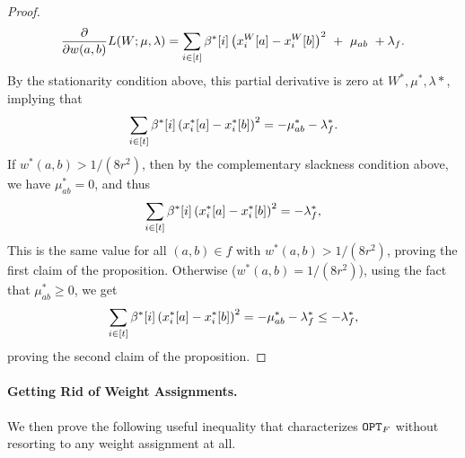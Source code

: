 \documentclass{article}
\begin{document}
\begin{proof}
\begin{align*}
        \frac{\partial}{\partial w(a,b)} L(W;\mu,\lambda) =
        \sum_{i\in [t]} \beta^*[i] \kh{x_i^{W}[a] - x_i^W[b]}^2\ 
        +\ \mu_{ab}\  +
        \lambda_f.
    \end{align*}
    By the stationarity condition above,
    this partial derivative is zero at $W^*,\mu^*,\lambda*$, implying that
    \begin{align*}
        \sum_{i\in [t]} \beta^*[i] \left(x_i^{*}[a] - x_i^*[b]\right)^2 = -\mu^*_{ab} - \lambda^*_f.
    \end{align*}
    If $w^*(a,b) > 1/(8r^2)$, then by the complementary slackness condition above,
    we have $\mu^*_{ab} = 0$, and thus
    \begin{align*}
        \sum_{i\in [t]} \beta^*[i] \left(x_i^{*}[a] - x_i^*[b]\right)^2 = - \lambda^*_f,
    \end{align*}
    This is the same value for all $(a,b)\in f$ with $w^*(a,b) > 1/(8r^2)$,
    proving the first claim of the proposition.
    Otherwise ($w^*(a,b) = 1/(8r^2)$), using the fact that
    $\mu^*_{ab} \geq 0$, we get
    \begin{align*}
        \sum_{i\in [t]} \beta^*[i] \left(x_i^{*}[a] - x_i^*[b]\right)^2 = -\mu^*_{ab} - \lambda^*_f
        \leq - \lambda^*_f,
    \end{align*}
    proving the second claim of the proposition.
\end{proof}

\paragraph{Getting Rid of Weight Assignments.}
We then prove the following useful inequality that characterizes $\mathtt{OPT}_F$ without
resorting to any weight assignment at all.
\end{document}
